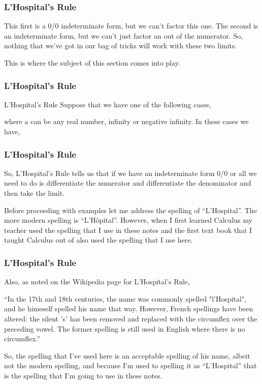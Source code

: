 \documentclass{beamer}
\begin{document}
\begin{frame}
	\frametitle{L’Hospital’s Rule}
	\large
This first is a 0/0 indeterminate form, but we can’t factor this one.  The second is an  indeterminate form, but we can’t just factor an  out of the numerator.  So, nothing that we’ve got in our bag of tricks will work with these two limits.
 
This is where the subject of this section comes into play. 
 
\end{frame}
\begin{frame}
	\frametitle{L’Hospital’s Rule}
	\large
L’Hospital’s Rule
Suppose that we have one of the following cases,
                             
where a can be any real number, infinity or negative infinity.  In these cases we have,
                                                       
 
\end{frame}
\begin{frame}
	\frametitle{L’Hospital’s Rule}
	\large
So, L’Hospital’s Rule tells us that if we have an indeterminate form 0/0 or  all we need to do is differentiate the numerator and differentiate the denominator and then take the limit.
 
Before proceeding with examples let me address the spelling of “L’Hospital”.  The more modern spelling is “L’Hôpital”.  However, when I first learned Calculus my teacher used the spelling that I use in these notes and the first text book that I taught Calculus out of also used the spelling that I use here.
\end{frame}
\begin{frame}
	\frametitle{L’Hospital’s Rule}
	\large
Also, as noted on the Wikipedia page for L’Hospital's Rule,
 
“In the 17th and 18th centuries, the name was commonly spelled "l'Hospital", and he himeself spelled his name that way. However, French spellings have been altered: the silent 's' has been removed and replaced with the circumflex over the preceding vowel. The former spelling is still used in English where there is no circumflex.”
 
So, the spelling that I’ve used here is an acceptable spelling of his name, albeit not the modern spelling, and because I’m used to spelling it as “L’Hospital” that is the spelling that I’m going to use in these notes.
\end{frame}
\end{document}
